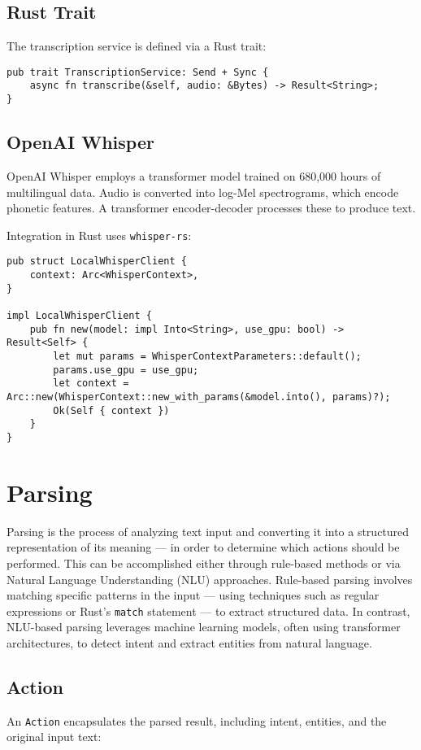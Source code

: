 \subsection{Rust Trait}
The transcription service is defined via a Rust trait:

\begin{verbatim}
pub trait TranscriptionService: Send + Sync {
    async fn transcribe(&self, audio: &Bytes) -> Result<String>;
}
\end{verbatim}

\subsection{OpenAI Whisper}
OpenAI Whisper employs a transformer model trained on 680,000 hours of multilingual data.
Audio is converted into log-Mel spectrograms, which encode phonetic features.
A transformer encoder-decoder processes these to produce text.

Integration in Rust uses \texttt{whisper-rs}:

\begin{verbatim}
pub struct LocalWhisperClient {
    context: Arc<WhisperContext>,
}

impl LocalWhisperClient {
    pub fn new(model: impl Into<String>, use_gpu: bool) -> Result<Self> {
        let mut params = WhisperContextParameters::default();
        params.use_gpu = use_gpu;
        let context = Arc::new(WhisperContext::new_with_params(&model.into(), params)?);
        Ok(Self { context })
    }
}
\end{verbatim}

\section{Parsing}
Parsing is the process of analyzing text input and converting it
into a structured representation of its meaning --- in order to determine which actions should be performed.
This can be accomplished either through rule-based methods
or via Natural Language Understanding (NLU) approaches.
Rule-based parsing involves matching specific patterns in the input ---
using techniques such as regular expressions or Rust's \texttt{match} statement ---
to extract structured data.
In contrast, NLU-based parsing leverages machine learning models,
often using transformer architectures, to detect intent and extract entities from natural language.

\subsection{Action}
An \texttt{Action} encapsulates the parsed result, including intent, entities, and the original input text:

